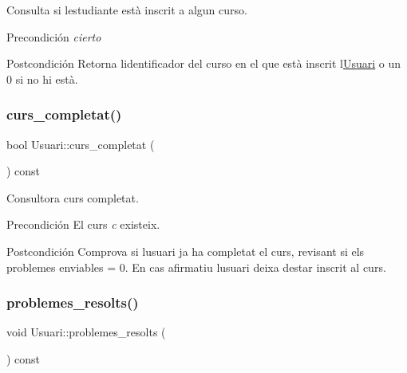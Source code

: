 Consulta si l\textquotesingle{}estudiante està inscrit a algun curso. 

\begin{DoxyPrecond}{Precondición}
{\itshape cierto} 
\end{DoxyPrecond}
\begin{DoxyPostcond}{Postcondición}
Retorna l\textquotesingle{}identificador del curso en el que està inscrit l\textquotesingle{}\mbox{\hyperlink{class_usuari}{Usuari}} o un 0 si no hi està. 
\end{DoxyPostcond}
\mbox{\label{class_usuari_a3cb6bb4ab49c3f858f3588c77af11527}} 
\subsubsection{\texorpdfstring{curs\+\_\+completat()}{curs\_completat()}}
{\footnotesize\ttfamily bool Usuari\+::curs\+\_\+completat (\begin{DoxyParamCaption}{ }\end{DoxyParamCaption}) const}



Consultora curs completat. 

\begin{DoxyPrecond}{Precondición}
El curs {\itshape c} existeix. 
\end{DoxyPrecond}
\begin{DoxyPostcond}{Postcondición}
Comprova si l\textquotesingle{}usuari ja ha completat el curs, revisant si els problemes enviables = 0. En cas afirmatiu l\textquotesingle{}usuari deixa d\textquotesingle{}estar inscrit al curs. 
\end{DoxyPostcond}
\mbox{\label{class_usuari_a3ef9f5ec04fe13ecfaf6d2f02bcd30bd}} 
\subsubsection{\texorpdfstring{problemes\+\_\+resolts()}{problemes\_resolts()}}
{\footnotesize\ttfamily void Usuari\+::problemes\+\_\+resolts (\begin{DoxyParamCaption}{ }\end{DoxyParamCaption}) const}



